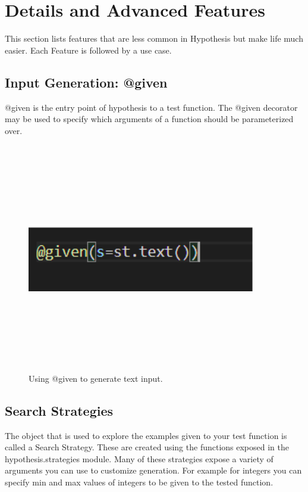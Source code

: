 \documentclass[12pt]{article}
\begin{document}
{\section{{\large Details and Advanced Features}}
This section lists features that are less common in Hypothesis but make life much easier.
Each Feature is followed by a use case.
\subsection{Input Generation: @given}
@given is the entry point of hypothesis to a test function. The @given decorator may be used to specify which arguments of a function should be parameterized over.
\begin{figure}[H]
	\includegraphics[width=10cm,height=10cm,keepaspectratio]{testing_2.png}
	\caption{Using @given to generate text input.}
	\label{fig 3: Property-based testing.}
\end{figure} 

\subsection{Search Strategies}
The object that is used to explore the examples given to your test function is called a Search Strategy. These are created using the functions exposed in the hypothesis.strategies module. Many of these strategies expose a variety of arguments you can use to customize generation. For example for integers you can specify min and max values of integers to be given to the tested function.
}
\end{document}

